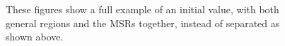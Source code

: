 \begin{figure}[H]
    \hfill%
    \caption{\label{fig:initial_value_assemblies_full} These figures show a
    full example of an initial value, with both general regions and
    the MSRs together, instead of separated as shown above.}
\end{figure}
